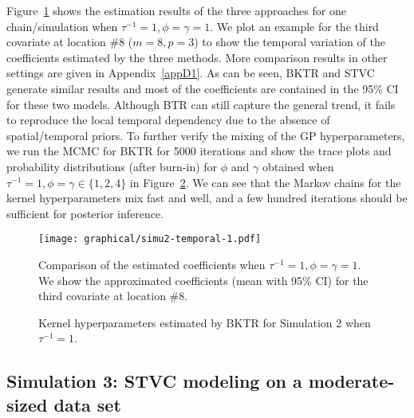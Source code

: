 \documentclass[12pt]{article}
\begin{document}
Figure~\ref{fig:simu2_temporal} shows the estimation results of the three approaches for one chain/simulation when $\tau^{-1}=1, \phi=\gamma=1$. We plot an example for the third covariate at location \#8 ($m=8, p=3$) to show the temporal variation of the coefficients estimated by the three methods. More comparison results in other settings are given in Appendix~\ref{appD1}. As can be seen, BKTR and STVC generate similar results and most of the coefficients are contained in the 95\% CI for these two models. Although BTR can still capture the general trend, it fails to reproduce the local temporal dependency due to the absence of spatial/temporal priors. To further verify the mixing of the GP hyperparameters, we run the MCMC for BKTR for 5000 iterations and show the trace plots and probability distributions (after burn-in) for $\phi$ and $\gamma$ obtained when $\tau^{-1}=1, \phi=\gamma\in\{1,2,4\}$ in Figure~\ref{fig:simu2_kernelHyper}. We can see that the Markov chains for the kernel hyperparameters mix fast and well, and a few hundred iterations should be sufficient for posterior inference.



\begin{figure}[!t]
\centering
\texttt{[image: graphical/simu2-temporal-1.pdf]}
\caption{{Comparison of the estimated coefficients when $\tau^{-1}=1,\phi=\gamma=1$. We show the approximated coefficients (mean with 95\% CI) for the third covariate at location \#8.}}
\label{fig:simu2_temporal}
\end{figure}


\begin{figure}[!t]
\centering
{}
\caption{{Kernel hyperparameters estimated by BKTR for Simulation 2 when $\tau^{-1}=1$.}}
\label{fig:simu2_kernelHyper}
\end{figure}



\subsection{Simulation 3: STVC modeling on a moderate-sized data set}
\end{document}
